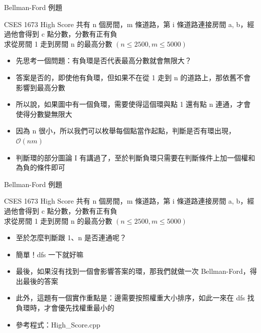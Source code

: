 \documentclass[aspectratio=169]{beamer}
\begin{document}
    \begin{frame}{Bellman-Ford 例題}
        \begin{block}{CSES 1673 High Score}
            共有 n 個房間，m 條道路，第 i 條道路連接房間 a, b，經過他會得到 c 點分數，分數有正有負\\
            求從房間 1 走到房間 n 的最高分數 $(n \le 2500, m \le 5000)$
        \end{block}

        \begin{itemize}
            \item<1-> 先思考一個問題：有負環是否代表最高分數就會無限大？
            \item<2-> 答案是否的，即使他有負環，但如果不在從 1 走到 n 的道路上，那依舊不會影響到最高分數
            \item<3-> 所以說，如果圖中有一個負環，需要使得這個環與點 1 還有點 n 連通，才會使得分數變無限大
            \item<4-> 因為 n 很小，所以我們可以枚舉每個點當作起點，判斷是否有環出現，$\mathcal{O}(nm)$
            \item<5-> 判斷環的部分圖論 I 有講過了，至於判斷負環只需要在判斷條件上加一個權和為負的條件即可
        \end{itemize}
    \end{frame}

    \begin{frame}{Bellman-Ford 例題}
        \begin{block}{CSES 1673 High Score}
            共有 n 個房間，m 條道路，第 i 條道路連接房間 a, b，經過他會得到 c 點分數，分數有正有負\\
            求從房間 1 走到房間 n 的最高分數 $(n \le 2500, m \le 5000)$
        \end{block}

        \begin{itemize}
            \item<1-> 至於怎麼判斷跟 1、n 是否連通呢？
            \item<2-> 簡單！dfs 一下就好嘛
            \item<3-> 最後，如果沒有找到一個會影響答案的環，那我們就做一次 Bellman-Ford，得出最後的答案
            \item<4-> 此外，這題有一個實作重點是：邊需要按照權重大小排序，如此一來在 dfs 找負環時，才會優先找權重最小的
            \item<4-> 參考程式：High\_Score.cpp
        \end{itemize}
    \end{frame}
\end{document}
